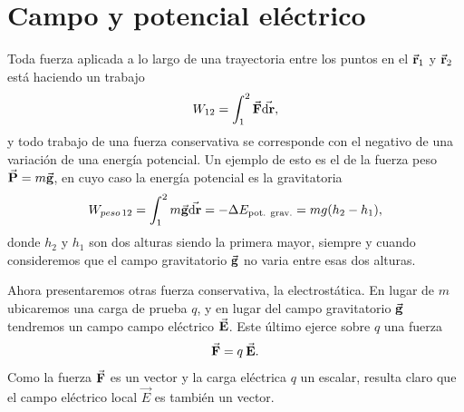 \documentclass[laboratorio]{guia}
\begin{document}
 
\maketitle


\section{Campo y potencial eléctrico}
Toda fuerza aplicada a lo largo de una trayectoria entre los puntos en el \(\va{r}_1\) y \(\va{r}_2\) está haciendo un trabajo
\begin{equation} 
  W_{12}= \int_1^2 \va{F} \va{\dd{r}},
\end{equation}
y todo trabajo de una fuerza conservativa se corresponde con el negativo de una variación de una energía potencial.
Un ejemplo de esto es el de la fuerza peso \(\va{P}= m \va{g}\), en cuyo caso la energía potencial es la gravitatoria
\begin{equation} 
  W_{peso\,12}= \int_1^2 m\va{g} \va{\dd{r}}= - \Delta E_\text{pot. grav.}= m g (h_2 - h_1), 
  \label{travail}
\end{equation}
donde \(h_2\) y \(h_1\) son dos alturas siendo la primera mayor, siempre y cuando consideremos que el campo gravitatorio \(\va{g}\) no varia entre esas dos alturas.

Ahora presentaremos otras fuerza conservativa, la electrostática.
En lugar de \(m\) ubicaremos una carga de prueba \(q\), y en lugar del campo gravitatorio \(\va{g}\) tendremos un campo campo eléctrico \(\va{E}\).
Este último ejerce sobre \(q\) una fuerza
\begin{equation} 
  \va{F} = q \: \va{E}.
  \label{forza}
\end{equation}
Como la fuerza \(\va{F}\) es un vector y la carga eléctrica \(q\) un escalar, resulta
claro que el campo eléctrico local \(\vec{E}\) es también un vector. 
\end{document}
